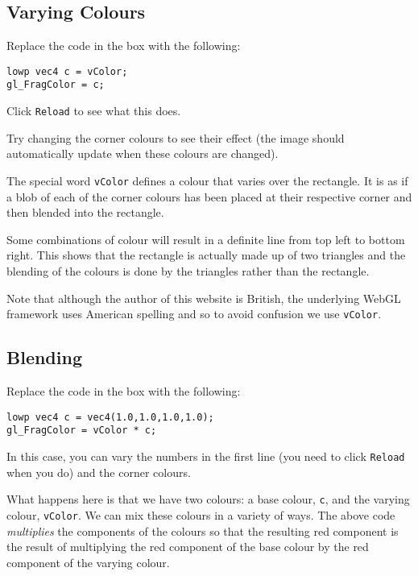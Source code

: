 \documentclass[
  html5,%
  mathml,%
  use filename%
]{internet}
\begin{document}
\subsection{Varying Colours}

Replace the code in the box with the following:

\begin{tcolorbox}
\begin{verbatim}
lowp vec4 c = vColor;
gl_FragColor = c;
\end{verbatim}
\end{tcolorbox}

Click \verb+Reload+ to see what this does.

Try changing the corner colours to see their effect (the image should automatically update when these colours are changed).

\begin{tcolorbox}
The special word \verb+vColor+ defines a colour that varies over the rectangle.
It is as if a blob of each of the corner colours has been placed at their respective corner and then blended into the rectangle.

Some combinations of colour will result in a definite line from top left to bottom right.
This shows that the rectangle is actually made up of two triangles and the blending of the colours is done by the triangles rather than the rectangle.

Note that although the author of this website is British, the underlying WebGL framework uses American spelling and so to avoid confusion we use \verb+vColor+.
\end{tcolorbox}

\subsection{Blending}

Replace the code in the box with the following:

\begin{tcolorbox}
\begin{verbatim}
lowp vec4 c = vec4(1.0,1.0,1.0,1.0);
gl_FragColor = vColor * c;
\end{verbatim}
\end{tcolorbox}

In this case, you can vary the numbers in the first line (you need to click \verb+Reload+ when you do) and the corner colours.

\begin{tcolorbox}
What happens here is that we have two colours: a base colour, \verb+c+, and the varying colour, \verb+vColor+.
We can mix these colours in a variety of ways.
The above code \emph{multiplies} the components of the colours so that the resulting red component is the result of multiplying the red component of the base colour by the red component of the varying colour.
\end{tcolorbox}
\end{document}
